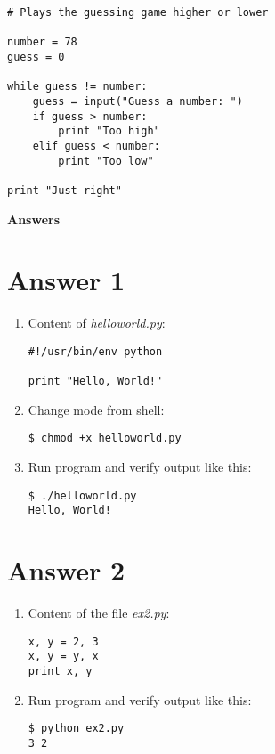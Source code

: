 \documentclass[11pt,a4paper]{article}
\begin{document}
\begin{verbatim}
# Plays the guessing game higher or lower 
 
number = 78
guess = 0
 
while guess != number: 
    guess = input("Guess a number: ")
    if guess > number:
        print "Too high"
    elif guess < number:
        print "Too low"
 
print "Just right"
\end{verbatim}

\newpage

\centerline{\LARGE\bf Answers}
\section*{Answer 1}

\begin{enumerate}
\item Content of {\it helloworld.py}:
\begin{verbatim}
#!/usr/bin/env python

print "Hello, World!"
\end{verbatim}

\item Change mode from shell:
\begin{verbatim}
$ chmod +x helloworld.py
\end{verbatim}

\item Run program and verify output like this:
\begin{verbatim}
$ ./helloworld.py
Hello, World!
\end{verbatim}
\end{enumerate}

\section*{Answer 2}
\begin{enumerate}
\item Content of the file {\it ex2.py}:
\begin{verbatim}
x, y = 2, 3
x, y = y, x
print x, y
\end{verbatim}

\item Run program and verify output like this:
\begin{verbatim}
$ python ex2.py
3 2
\end{verbatim}

\end{enumerate}
\end{document}
